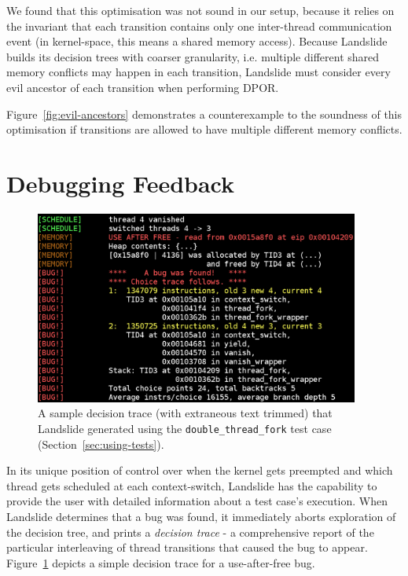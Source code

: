 We found that this optimisation was not sound in our setup, because it relies on the invariant that each transition contains only one inter-thread communication event (in kernel-space, this means a shared memory access). Because Landslide builds its decision trees with coarser granularity, i.e. multiple different shared memory conflicts may happen in each transition, Landslide must consider every evil ancestor of each transition when performing DPOR.

Figure~\ref{fig:evil-ancestors} demonstrates a counterexample to the soundness of this optimisation if transitions are allowed to have multiple different memory conflicts.

\section{Debugging Feedback}

\begin{figure}[t]
	\begin{center}
		\includegraphics[width=0.95\textwidth]{found_a_bug.png}
	\end{center}
	\caption{A sample decision trace (with extraneous text trimmed) that Landslide generated using the \texttt{double\_thread\_fork} test case (Section~\ref{sec:using-tests}).}
	\label{fig:found_a_bug}
\end{figure}

In its unique position of control over when the kernel gets preempted and which thread gets scheduled at each context-switch, Landslide has the capability to provide the user with detailed information about a test case's execution.
When Landslide determines that a bug was found, it immediately aborts exploration of the decision tree, and prints a {\em decision trace} - a comprehensive report of the particular interleaving of thread transitions that caused the bug to appear. Figure~\ref{fig:found_a_bug} depicts a simple decision trace for a use-after-free bug.

